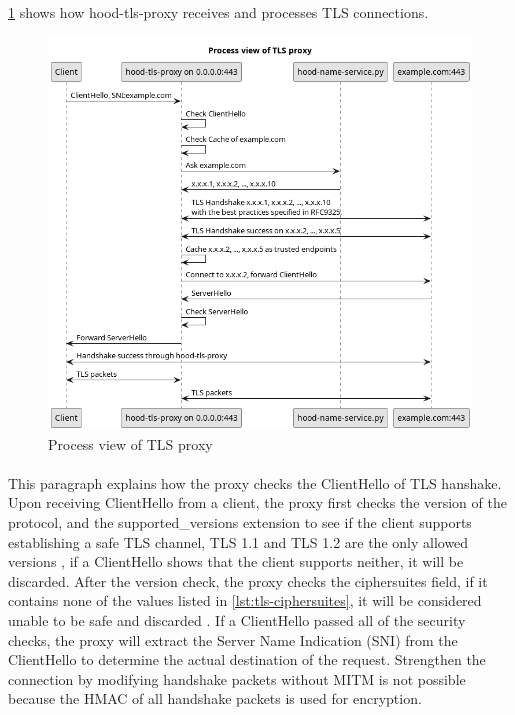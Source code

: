 \documentclass[mscthesis]{usiinfthesis}
\begin{document}
\paragraph{}
\cref{fig:tls-proxy-process-view} shows how hood-tls-proxy receives and processes TLS connections.
\begin{figure}[H]
  \includegraphics[width=\textwidth]{graphics/puml/process-tls-proxy.png}
  \caption{Process view of TLS proxy}
  \label{fig:tls-proxy-process-view}
\end{figure}

\paragraph{}
This paragraph explains how the proxy checks the ClientHello of TLS hanshake. Upon receiving ClientHello from a client, the proxy first checks the version of the protocol, and the supported\_versions extension to see if the client supports establishing a safe TLS channel, TLS 1.1 and TLS 1.2 are the only allowed versions \citep{rfc:bstprc}, if a ClientHello shows that the client supports neither, it will be discarded. After the version check, the proxy checks the ciphersuites field, if it contains none of the values listed in \cref{lst:tls-ciphersuites}, it will be considered unable to be safe and discarded \citep{rfc:bstprc}. If a ClientHello passed all of the security checks, the proxy will extract the Server Name Indication (SNI) from the ClientHello to determine the actual destination of the request. Strengthen the connection by modifying handshake packets without MITM is not possible because the HMAC of all handshake packets is used for encryption.
\end{document}
